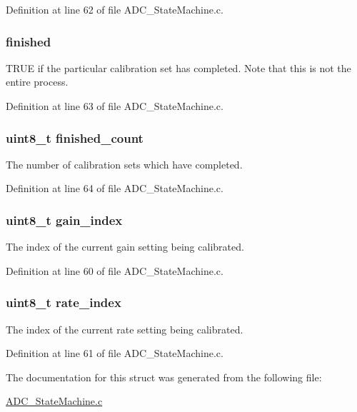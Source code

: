 Definition at line 62 of file A\-D\-C\-\_\-\-State\-Machine.\-c.

\hypertarget{struct_calibration_state__t_a9324389a5cdc532c6417a87ccafe18ce}{
\subsubsection[{finished}]{ finished}}\label{struct_calibration_state__t_a9324389a5cdc532c6417a87ccafe18ce}
T\-R\-U\-E if the particular calibration set has completed. Note that this is not the entire process. 

Definition at line 63 of file A\-D\-C\-\_\-\-State\-Machine.\-c.

\hypertarget{struct_calibration_state__t_adf2e3081566a821fce9f314e5d5348cc}{
\subsubsection[{finished\-\_\-count}]{\setlength{\rightskip}{0pt plus 5cm}uint8\-\_\-t finished\-\_\-count}}\label{struct_calibration_state__t_adf2e3081566a821fce9f314e5d5348cc}
The number of calibration sets which have completed. 

Definition at line 64 of file A\-D\-C\-\_\-\-State\-Machine.\-c.

\hypertarget{struct_calibration_state__t_a1726d9a3d7daf8e1b958e6a6b808a9de}{
\subsubsection[{gain\-\_\-index}]{\setlength{\rightskip}{0pt plus 5cm}uint8\-\_\-t gain\-\_\-index}}\label{struct_calibration_state__t_a1726d9a3d7daf8e1b958e6a6b808a9de}
The index of the current gain setting being calibrated. 

Definition at line 60 of file A\-D\-C\-\_\-\-State\-Machine.\-c.

\hypertarget{struct_calibration_state__t_a0f6cfefaa997e30d150fb53ceeb28d57}{
\subsubsection[{rate\-\_\-index}]{\setlength{\rightskip}{0pt plus 5cm}uint8\-\_\-t rate\-\_\-index}}\label{struct_calibration_state__t_a0f6cfefaa997e30d150fb53ceeb28d57}
The index of the current rate setting being calibrated. 

Definition at line 61 of file A\-D\-C\-\_\-\-State\-Machine.\-c.



The documentation for this struct was generated from the following file\-:\begin{DoxyCompactItemize}
\item 
\hyperlink{_a_d_c___state_machine_8c}{A\-D\-C\-\_\-\-State\-Machine.\-c}\end{DoxyCompactItemize}
